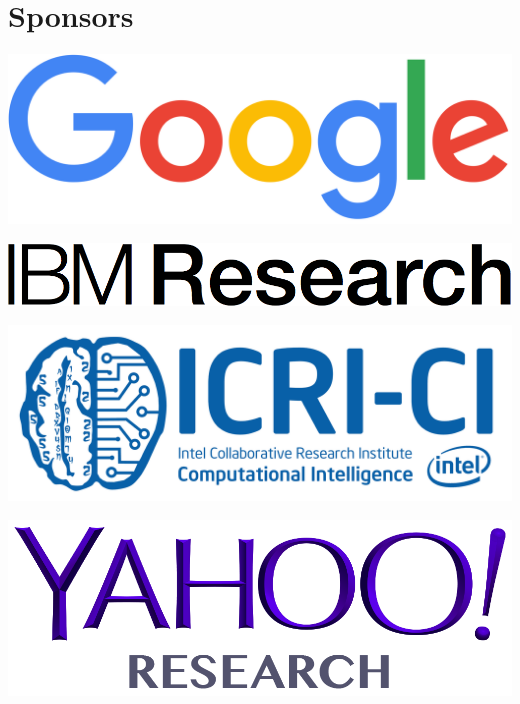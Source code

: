 \documentclass[a0,portrait]{a0poster}
\begin{document}
\hfill
\begin{minipage}{.2\textwidth}
\section*{Sponsors}
\includegraphics[width=\textwidth]{google_logo.png}

\vspace{1cm}

\includegraphics[width=\textwidth]{ibmresearch_logo.png}

\vspace{1cm}

\includegraphics[width=\textwidth]{icrici_logo.png}

\vspace{1cm}

\includegraphics[width=\textwidth]{yahoo_logo.png}

\vspace{1cm}


\end{minipage}
\end{document}
